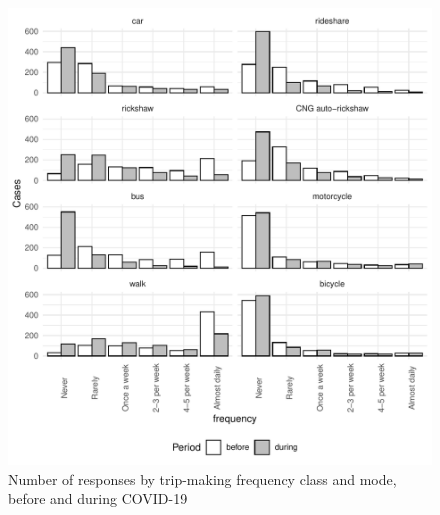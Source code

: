 \documentclass[]{elsarticle} %
\begin{document}
\begin{figure}
\centering
\includegraphics{Frequency-of-Travel-by-Mode-COVID-19-Bangladesh_files/figure-latex/column-plot-cases-before-after-1.pdf}
\caption{\label{fig:column-plot-cases}Number of responses by trip-making
frequency class and mode, before and during COVID-19}
\end{figure}
\end{document}
